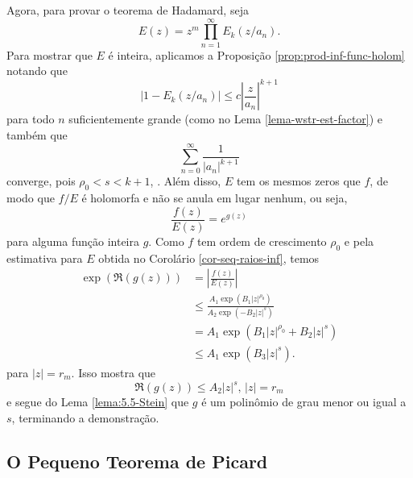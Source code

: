     Agora, para provar o teorema de Hadamard, seja
    \begin{equation*}
        E(z) = z^m \prod_{n=1}^{\infty} E_k(z/a_n).
    \end{equation*}
    Para mostrar que $E$ é inteira, aplicamos a Proposição \ref{prop:prod-inf-func-holom} notando que
    \begin{equation*}
        |1 - E_k(z/a_n)| \leq c\left| \frac{z}{a_n} \right|^{k+1}
    \end{equation*}
    para todo $n$ suficientemente grande (como no Lema \ref{lema-wstr-est-factor}) e também que
    \begin{equation*}
        \sum_{n=0}^{\infty} \frac{1}{|a_n|^{k+1}}
    \end{equation*}
    converge, pois $\rho_0 < s < k+1$, . Além disso, $E$ tem os mesmos zeros 
    que $f$, de modo que $f/E$ é holomorfa e não se anula em lugar nenhum,
    ou seja,
    \begin{equation*}
        \frac{f(z)}{E(z)} = e^{g(z)}
    \end{equation*}
    para alguma função inteira $g$. Como $f$ tem ordem de crescimento
    $\rho_0$ e pela estimativa para $E$ obtida no Corolário \ref{cor-seq-raios-inf},
    temos
    \begin{align*}
        \exp(\Re(g(z))) &= \left| \frac{f(z)}{E(z)} \right| \\
                        &\leq \frac{A_1 \exp( B_1|z|^{\rho_0} )}{A_2 \exp( -B_2|z|^{s} )} \\
                        &= A_1 \exp(B_1 |z|^{\rho_0} + B_2 |z|^s) \\
                        &\leq A_1 \exp(B_3 |z|^s).
    \end{align*}
    para $|z| = r_m$. Isso mostra que
    \begin{equation*}
        \Re(g(z)) \leq A_2|z|^s, \, |z| = r_m
    \end{equation*}
    e segue do Lema \ref{lema:5.5-Stein} que $g$ é um polinômio de grau menor
    ou igual a $s$, terminando a demonstração.
 
 
 
 
 
    \subsection{O Pequeno Teorema de Picard}
    
